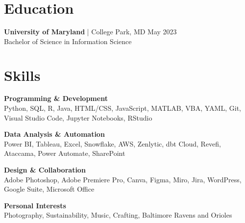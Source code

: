 \documentclass[a4paper,10pt]{article}
\begin{document}
\section{Education}
\textbf{University of Maryland} | College Park, MD \hfill May 2023 \\
Bachelor of Science in Information Science


\section{Skills}
\begin{multicols}{2}
\textbf{Programming \& Development} \\
Python, SQL, R, Java, HTML/CSS, JavaScript, MATLAB, VBA, YAML, Git, Visual Studio Code, Jupyter Notebooks, RStudio

\columnbreak

\textbf{Data Analysis \& Automation} \\
Power BI, Tableau, Excel, Snowflake, AWS, Zenlytic, dbt Cloud, Revefi, Ataccama, Power Automate, SharePoint
\end{multicols}

\begin{multicols}{2}
\textbf{Design \& Collaboration} \\
Adobe Photoshop, Adobe Premiere Pro, Canva, Figma, Miro, Jira, WordPress, Google Suite, Microsoft Office

\columnbreak

\textbf{Personal Interests} \\
Photography, Sustainability, Music, Crafting, Baltimore Ravens and Orioles
\end{multicols}


\end{document}
